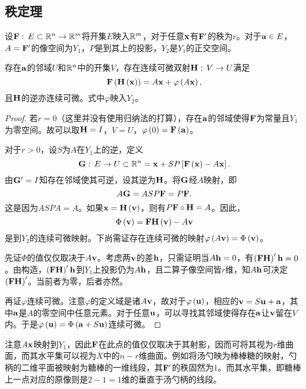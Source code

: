 \documentclass{ctexrep}
\begin{document}
  \subsection{秩定理}
  \begin{theorem}
  设$\mathbf{F}:\, E\subset\mathbb{R}^n \rightarrow \mathbb{R}^m$将开集$E$映入$\mathbb{R}^m$，对于任意$\mathbf{x}$有$\mathbf{F}'$的秩为$r$。对于$\mathbf{a}\in E$，$A=\mathbf{F}'$的像空间为$Y_1$，$P$是到其上的投影，$Y_2$是$Y_1$的正交空间。
  \par
  存在$\mathbf{a}$的邻域$U$和$\mathbb{R}^n$中的开集$V$，存在连续可微双射$\mathbf{H}:\, V \rightarrow U$满足
  \[ \mathbf{F}\left(\mathbf{H}\left(\mathbf{x}\right)\right) = A\mathbf{x}+\varphi\left(A\mathbf{x}\right), \]
  且$\mathbf{H}$的逆亦连续可微。式中$\varphi$映入$Y_2$。
  \end{theorem}
  \begin{proof}
    若$r=0$（这里并没有使用归纳法的打算），存在$\mathbf{a}$的邻域使得$\mathbf{F}$为常量且$Y_1$为零空间。故可以取$\mathbf{H}=I$，$V=U$，$\varphi\left(0\right)=\mathbf{F}\left(\mathbf{a}\right)$。
    \par
    对于$r>0$，设$S$为$A$在$Y_1$上的逆，定义
    \[ \mathbf{G}:\, E \rightarrow U\subset\mathbb{R}^n = \mathbf{x}+SP\left[\mathbf{F}\left(\mathbf{x}\right)-A\mathbf{x}\right]. \]
    由$\mathbf{G}'=I$知存在邻域使其可逆，设其逆为$\mathbf{H}$。将$\mathbf{G}$经$A$映射，即
    \[ A\mathbf{G} = ASP\mathbf{F} = P\mathbf{F}. \]
    这是因为$ASPA=A$。如果$\mathbf{x} = \mathbf{H}\left(\mathbf{v}\right)$，则有$P\mathbf{F}\circ\mathbf{H}=A$。因此，
    \[  \Phi\left(\mathbf{v}\right)=\mathbf{F}\mathbf{H}\left(\mathbf{v}\right)-A\mathbf{v} \]
    是到$Y_2$的连续可微映射。下尚需证存在连续可微的映射$\varphi\left(A\mathbf{v}\right) = \Phi\left(\mathbf{v}\right)$。
    \par
    先证$\Phi$的值仅仅取决于$A\mathbf{v}$。考虑两$\mathbf{v}$的差$\mathbf{h}$，只需证明当$A\mathbf{h}=0$，有$\left(\mathbf{F}\mathbf{H}\right)'\mathbf{h}=0$。由构造，$\left(\mathbf{F}\mathbf{H}\right)'\mathbf{h}$到$Y_1$上投影仍为$A\mathbf{h}$，且二算子像空间皆$r$维，知$A\mathbf{h}$可决定$\left(\mathbf{F}\mathbf{H}\right)'$。当前者为零，后者亦然。
    \par
    再证$\varphi$连续可微。注意$\varphi$的定义域是诸$A\mathbf{v}$，故对于$\varphi\left(\mathbf{u}\right)$，相应的$\mathbf{v}=S\mathbf{u}+\mathbf{a}$，其中$\mathbf{a}$是$A$的零空间中任意元素。对于任意$\mathbf{u}$，可以寻找其邻域使得存在$\mathbf{a}$让$\mathbf{v}$留在$V$内。于是$\varphi\left(\mathbf{u}\right)=\Phi\left(\mathbf{a}+S\mathbf{u}\right)$连续可微。
  \end{proof}
  注意$A\mathbf{x}$映射到$Y_1$，因此$\mathbf{F}$在此点的值仅仅取决于其射影，因而可将其视为$r$维曲面，而其水平集可以视为$X$中的$n-r$维曲面。例如将汤勺映为棒棒糖的映射，勺柄的二维平面被映射为糖棒的一维线段，其$\mathbf{F}'$的秩固然为$1$。而其水平集，即糖棒上一点对应的原像则是$2-1=1$维的垂直于汤勺柄的线段。

 
\ifx\allfiles\undefined %
\end{document}

